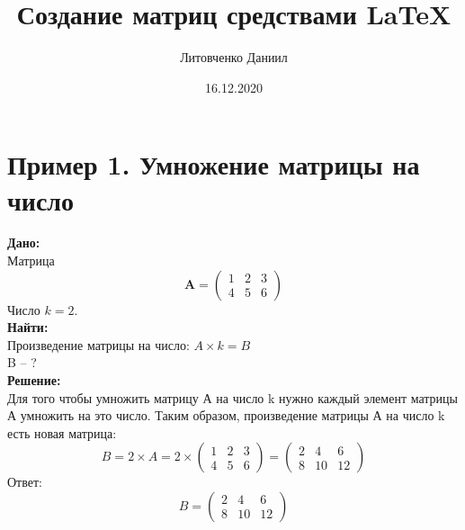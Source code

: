 \documentclass[a4paper,12pt]{article} %
\author{Литовченко Даниил}
\title{Создание матриц средствами \LaTeX{}}
\date{16.12.2020}
\begin{document}

\maketitle
\newpage

\section{Пример 1. Умножение матрицы на число}

\textbf{Дано:} \\
Матрица
\begin{displaymath}
\mathbf{A} =
\left( \begin{array}{ccc}
1 & 2 & 3\\
4 & 5 & 6 
\end{array} \right)
\end{displaymath}
Число $k=2$.\\
\textbf{Найти:}\\
Произведение матрицы на число: $A\times k=B$\\
B -- ?\\
\textbf{Решение:}\\
Для того чтобы умножить матрицу А на число k нужно каждый элемент матрицы А умножить на это число.
Таким образом, произведение матрицы А на число k есть новая матрица:
\begin{displaymath}
B = 2\times A = 2\times
\begin{pmatrix}
1 & 2 & 3\\
4 & 5 & 6 
\end{pmatrix}= 
\begin{pmatrix}
2 & 4 & 6\\
8 & 10 & 12 
\end{pmatrix}
\end{displaymath}
Ответ:
\begin{displaymath}
B = \begin{pmatrix}
2 & 4 & 6\\
8 & 10 & 12 
\end{pmatrix}
\end{displaymath}
\end{document}
